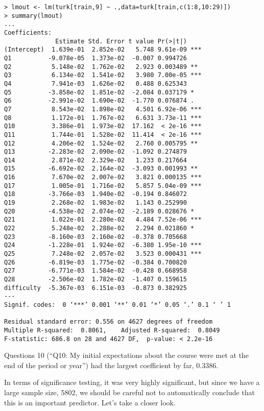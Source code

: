 \begin{lstlisting}
> lmout <- lm(turk[train,9] ~ .,data=turk[train,c(1:8,10:29)])
> summary(lmout)
...
Coefficients:
              Estimate Std. Error t value Pr(>|t|)    
(Intercept)  1.639e-01  2.852e-02   5.748 9.61e-09 ***
Q1          -9.078e-05  1.373e-02  -0.007 0.994726    
Q2           5.148e-02  1.762e-02   2.923 0.003489 ** 
Q3           6.134e-02  1.541e-02   3.980 7.00e-05 ***
Q4           7.941e-03  1.626e-02   0.488 0.625343    
Q5          -3.858e-02  1.851e-02  -2.084 0.037179 *  
Q6          -2.991e-02  1.690e-02  -1.770 0.076874 .  
Q7           8.543e-02  1.898e-02   4.501 6.92e-06 ***
Q8           1.172e-01  1.767e-02   6.631 3.73e-11 ***
Q10          3.386e-01  1.973e-02  17.162  < 2e-16 ***
Q11          1.744e-01  1.528e-02  11.414  < 2e-16 ***
Q12          4.206e-02  1.524e-02   2.760 0.005795 ** 
Q13         -2.283e-02  2.090e-02  -1.092 0.274879    
Q14          2.871e-02  2.329e-02   1.233 0.217664    
Q15         -6.692e-02  2.164e-02  -3.093 0.001993 ** 
Q16          7.670e-02  2.007e-02   3.821 0.000135 ***
Q17          1.005e-01  1.716e-02   5.857 5.04e-09 ***
Q18         -3.766e-03  1.940e-02  -0.194 0.846072    
Q19          2.268e-02  1.983e-02   1.143 0.252990    
Q20         -4.538e-02  2.074e-02  -2.189 0.028676 *  
Q21          1.022e-01  2.280e-02   4.484 7.52e-06 ***
Q22          5.248e-02  2.288e-02   2.294 0.021860 *  
Q23         -8.160e-03  2.160e-02  -0.378 0.705668    
Q24         -1.228e-01  1.924e-02  -6.380 1.95e-10 ***
Q25          7.248e-02  2.057e-02   3.523 0.000431 ***
Q26         -6.819e-03  1.775e-02  -0.384 0.700820    
Q27         -6.771e-03  1.584e-02  -0.428 0.668958    
Q28         -2.506e-02  1.782e-02  -1.407 0.159615    
difficulty  -5.367e-03  6.151e-03  -0.873 0.382925    
---
Signif. codes:  0 ‘***’ 0.001 ‘**’ 0.01 ‘*’ 0.05 ‘.’ 0.1 ‘ ’ 1

Residual standard error: 0.556 on 4627 degrees of freedom
Multiple R-squared:  0.8061,    Adjusted R-squared:  0.8049 
F-statistic: 686.8 on 28 and 4627 DF,  p-value: < 2.2e-16
\end{lstlisting}

Questions 10 (``Q10:  My initial expectations about the course were met
at the end of the period or year'') had the largest coefficient by far,
0.3386.  

In terms of significance testing, it was very highly significant, but
since we have a large sample size, 5802, we should be careful not to
automatically conclude that this is an important predictor.  Let's take
a closer look.

